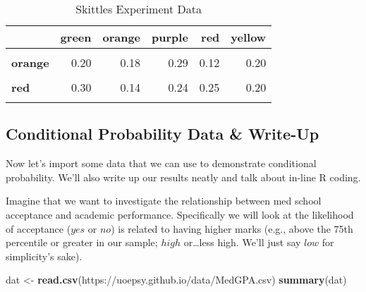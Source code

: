 \documentclass[
]{article}
\newenvironment{Shaded}{\begin{snugshade}}{\end{snugshade}}
\newcommand{\FunctionTok}[1]{\textcolor[rgb]{0.13,0.29,0.53}{\textbf{#1}}}
\newcommand{\NormalTok}[1]{#1}
\newcommand{\OtherTok}[1]{\textcolor[rgb]{0.56,0.35,0.01}{#1}}
\newcommand{\StringTok}[1]{\textcolor[rgb]{0.31,0.60,0.02}{#1}}
\begin{document}
\begin{table}[!h]
\centering
\caption{\label{tab:unnamed-chunk-11}Skittles Experiment Data}
\centering
\begin{tabular}[t]{>{}lrrrrr}
\toprule
\textbf{ } & \textbf{green} & \textbf{orange} & \textbf{purple} & \textbf{red} & \textbf{yellow}\\
\midrule
\textbf{\cellcolor{gray!10}{green}} & \cellcolor{gray!10}{0.05} & \cellcolor{gray!10}{0.18} & \cellcolor{gray!10}{0.05} & \cellcolor{gray!10}{0.31} & \cellcolor{gray!10}{0.40}\\
\textbf{orange} & 0.20 & 0.18 & 0.29 & 0.12 & 0.20\\
\textbf{\cellcolor{gray!10}{purple}} & \cellcolor{gray!10}{0.15} & \cellcolor{gray!10}{0.29} & \cellcolor{gray!10}{0.29} & \cellcolor{gray!10}{0.12} & \cellcolor{gray!10}{0.13}\\
\textbf{red} & 0.30 & 0.14 & 0.24 & 0.25 & 0.20\\
\textbf{\cellcolor{gray!10}{yellow}} & \cellcolor{gray!10}{0.30} & \cellcolor{gray!10}{0.21} & \cellcolor{gray!10}{0.14} & \cellcolor{gray!10}{0.19} & \cellcolor{gray!10}{0.07}\\
\bottomrule
\end{tabular}
\end{table}

\subsection{Conditional Probability Data \&
Write-Up}\label{conditional-probability-data-write-up}

Now let's import some data that we can use to demonstrate conditional
probability. We'll also write up our results neatly and talk about
in-line R coding.

Imagine that we want to investigate the relationship between med school
acceptance and academic performance. Specifically we will look at the
likelihood of acceptance (\(yes\) or \(no\)) is related to having higher
marks (e.g., above the 75th percentile or greater in our sample;
\(high\) or\ldots less high. We'll just say \(low\) for simplicity's
sake).

\begin{Shaded}
\begin{Highlighting}[]
\NormalTok{dat }\OtherTok{\textless{}{-}} \FunctionTok{read.csv}\NormalTok{(}\StringTok{\textquotesingle{}https://uoepsy.github.io/data/MedGPA.csv\textquotesingle{}}\NormalTok{)}
\FunctionTok{summary}\NormalTok{(dat)}
\end{Highlighting}
\end{Shaded}
\end{document}
